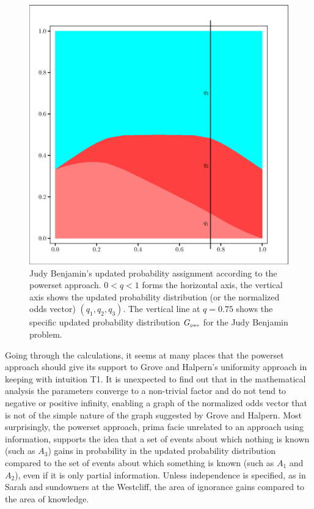 \documentclass[12pt]{article}
\begin{document}
\begin{figure}[h]
  \begin{flushright}
    \begin{minipage}[h]{\lwv\linewidth}
      \includegraphics[width=\textwidth]{zeroone-pwst.eps}
      \caption{Judy Benjamin's updated probability assignment
        according to the powerset approach. $0<q<1$ forms the
        horizontal axis, the vertical axis shows the updated
        probability distribution (or the normalized odds vector)
        $(q_{1},q_{2},q_{3})$. The vertical line at $q=0.75$ shows the
        specific updated probability distribution $G_{\mbox{\tiny
            pws}}$ for the Judy Benjamin problem.}
      \label{fig:pwst}
    \end{minipage}
  \end{flushright}
\end{figure}

Going through the calculations, it seems at many places that the
powerset approach should give its support to Grove and Halpern's
uniformity approach in keeping with intuition T1. It is unexpected to
find out that in the mathematical analysis the parameters converge to
a non-trivial factor and do not tend to negative or positive infinity,
enabling a graph of the normalized odds vector that is not of the
simple nature of the graph suggested by Grove and Halpern. Most
surprisingly, the powerset approach, prima facie unrelated to an
approach using information, supports the idea that a set of events
about which nothing is known (such as $A_{3}$) gains in probability in
the updated probability distribution compared to the set of events
about which something is known (such as $A_{1}$ and $A_{2}$), even if
it is only partial information. Unless independence is specified, as
in Sarah and sundowners at the Westcliff, the area of ignorance gains
compared to the area of knowledge.
\end{document}
